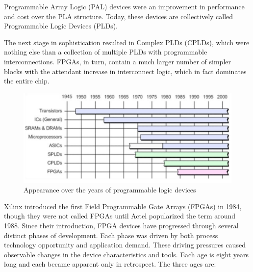 \noindent Programmable Array Logic (PAL) devices were an
improvement in performance and cost over the PLA structure. Today, these devices are collectively
called Programmable Logic Devices (PLDs).

\noindent The next stage in sophistication resulted in Complex PLDs (CPLDs), which were nothing else
than a collection of multiple PLDs with programmable interconnections. FPGAs, in turn, contain a
much larger number of simpler blocks with the attendant increase in interconnect logic, which in fact
dominates the entire chip.
\begin{figure}[H]
	\centering
	\includegraphics[width=0.7\linewidth]{IMG/ch3/TIME}
	\caption{Appearance over the years of programmable logic devices\cite{fpga3}}
	\label{fig:time}
\end{figure}
\noindent Xilinx introduced the first Field Programmable Gate Arrays
(FPGAs) in 1984, though they were not called FPGAs until
Actel popularized the term around 1988\cite{fpga2}. Since their introduction, FPGA devices have progressed
through several distinct phases of development.
Each phase was driven by both process technology opportunity
and application demand. These driving pressures
caused observable changes in the device characteristics
and tools. Each age is eight years long and each
became apparent only in retrospect. The three ages are:
